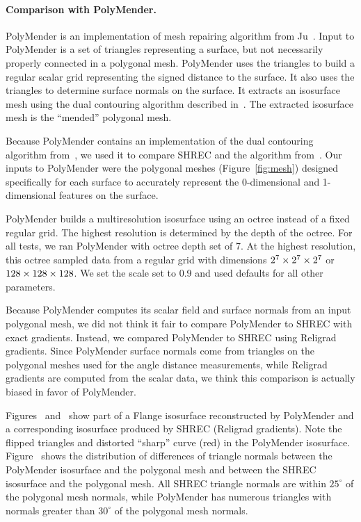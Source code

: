 \paragraph{Comparison with PolyMender.}

PolyMender is an implementation of mesh repairing algorithm from Ju~\cite{j-rrpm-04}.
Input to PolyMender is a set of triangles representing a surface,
but not necessarily properly connected in a polygonal mesh.
PolyMender uses the triangles to build a regular scalar grid
representing the signed distance to the surface.
It also uses the triangles to determine surface normals
on the surface.
It extracts an isosurface mesh using the dual contouring algorithm 
described in~\cite{jlsw-dchd-02,sw-dcss-02}.
The extracted isosurface mesh is the ``mended'' polygonal mesh.

Because PolyMender contains an implementation of the dual contouring algorithm
from~\cite{jlsw-dchd-02,sw-dcss-02},
we used it to compare SHREC and the algorithm from~\cite{jlsw-dchd-02,sw-dcss-02}.
Our inputs to PolyMender were the polygonal meshes
(Figure~\ref{fig:mesh})
designed specifically for each surface to accurately represent the 0-dimensional
and 1-dimensional features on the surface.

PolyMender builds a multiresolution isosurface
using an octree instead of a fixed regular grid.
The highest resolution is determined by the depth of the octree.
For all tests, we ran PolyMender with octree depth set of 7.
At the highest resolution,
this octree sampled data from a regular grid with dimensions $2^7 \times 2^7 \times 2^7$ or $128 \times 128 \times 128$.
We set the scale set to 0.9 and used defaults for all other parameters.

Because PolyMender computes its scalar field and surface normals
from an input polygonal mesh,
we did not think it fair to compare PolyMender to SHREC with exact gradients.
Instead, we compared PolyMender to SHREC using Religrad gradients.
Since PolyMender surface normals come from triangles on the polygonal meshes
used for the angle distance measurements,
while Religrad gradients are computed from the scalar data,
we think this comparison is actually biased in favor of PolyMender.

Figures~\protect{} 
and~\protect{} 
show part of a Flange isosurface reconstructed by PolyMender
and a corresponding isosurface produced by SHREC (Religrad gradients).
Note the flipped triangles and distorted ``sharp'' curve (red) in the PolyMender isosurface.
Figure~\protect{} shows the distribution of differences 
of triangle normals between the PolyMender isosurface and the polygonal mesh
and between the SHREC isosurface and the polygonal mesh.
All SHREC triangle normals are within $25^\circ$ of the polygonal mesh normals,
while PolyMender has numerous triangles with normals greater than $30^\circ$
of the polygonal mesh normals.

